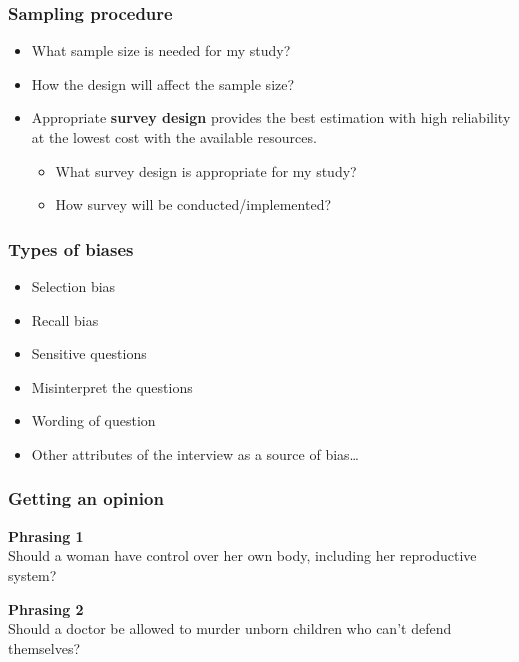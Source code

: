 \documentclass[a4paper]{article}
\begin{document}
\subsubsection{Sampling procedure}
\begin{itemize}
    \item What sample size is needed for my study?
    \item How the design will affect the sample size?
    \item Appropriate \textbf{survey design} provides the best estimation with high reliability at the lowest cost with the available resources.
    \begin{itemize}
        \item What survey design is appropriate for my study?
        \item How survey will be conducted/implemented?            
    \end{itemize}
\end{itemize}
\subsubsection{Types of biases}
\begin{itemize}
    \item Selection bias
    \item Recall bias
    \item Sensitive questions
    \item Misinterpret the questions
    \item Wording of question
    \item Other attributes of the interview as a source of bias…
\end{itemize}
\subsubsection{Getting an opinion}
\begin{greenbox}
	\textbf{Phrasing 1}\\
	Should a woman have control over her own body, including her reproductive system?
\end{greenbox}
\begin{greenbox}
	\textbf{Phrasing 2}\\
	Should a doctor be allowed to murder unborn children who can't defend themselves?
\end{greenbox}
\end{document}
